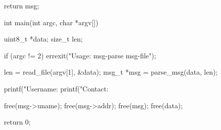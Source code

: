 \begin{appendices}
\begin{TCBlisting}[language={[ANSI]C},basicstyle=\scriptsize,caption={\mylstcaption}]
{    return msg;
}

int
main(int argc, char *argv[]) {
    uint8_t *data;
    size_t len;
    
    if (argc != 2) {
        errexit("Usage: msg-parse msg-file\n");
    }

    len = read_file(argv[1], &data);
    msg_t *msg = parse_msg(data, len);    

    printf("Username: %
    printf("Contact: %

    free(msg->uname);
    free(msg->addr);
    free(msg);
    free(data);

    return 0;
}
\end{TCBlisting}

\end{appendices}
